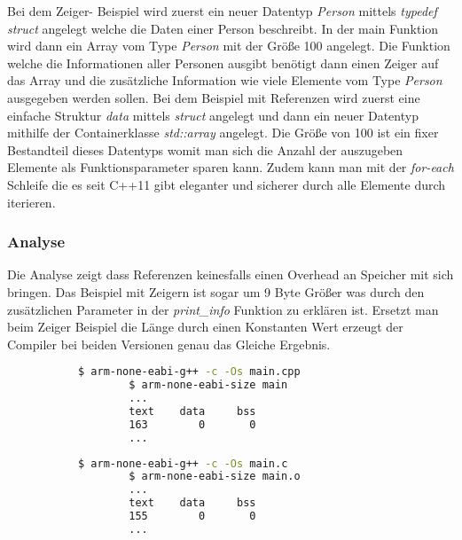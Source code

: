 \documentclass[MES,Master,ngerman]{twbook}%
\begin{document}
Bei dem Zeiger- Beispiel wird zuerst ein neuer Datentyp \textit{Person} mittels \textit{typedef struct} angelegt welche die Daten einer Person beschreibt. In der main Funktion wird dann ein Array vom Type \textit{Person} mit der Größe 100 angelegt. Die Funktion welche die Informationen aller Personen ausgibt benötigt dann einen Zeiger auf das Array und die zusätzliche Information wie viele Elemente vom Type \textit{Person} ausgegeben werden sollen.\newline \newline
Bei dem Beispiel mit Referenzen wird zuerst eine einfache Struktur \textit{data} mittels \textit{struct} angelegt und dann ein neuer Datentyp mithilfe der Containerklasse \textit{std::array} angelegt. Die Größe von 100 ist ein fixer Bestandteil dieses Datentyps womit man sich die Anzahl der auszugeben Elemente als Funktionsparameter sparen kann. Zudem kann man mit der \textit{for-each} Schleife die es seit C++11 gibt eleganter und sicherer durch alle Elemente durch iterieren. 

\subsubsection{Analyse}
Die Analyse zeigt dass Referenzen keinesfalls einen Overhead an Speicher mit sich bringen. Das Beispiel mit Zeigern ist sogar um 9 Byte Größer was durch den zusätzlichen Parameter in der \textit{print\_info} Funktion zu erklären ist. Ersetzt man beim Zeiger Beispiel die Länge durch einen Konstanten Wert erzeugt der Compiler bei beiden Versionen genau das Gleiche Ergebnis.

\begin{figure}[!htb]
	\begin{subfigure}[b]{0.5\textwidth}
		\begin{lstlisting}[gobble=6, title={Analyse Zeiger Beispiel}, language=bash, numbers=none]
		$ arm-none-eabi-g++ -c -Os main.cpp
		$ arm-none-eabi-size main
		...
		text    data     bss
		163        0       0
		...
		\end{lstlisting}
	\end{subfigure}
	\begin{subfigure}[b]{0.5\textwidth}
		\begin{lstlisting}[gobble=6, title={Analyse Referenze Beispiel}, language=bash, numbers=none]
		$ arm-none-eabi-g++ -c -Os main.c
		$ arm-none-eabi-size main.o
		...
		text    data     bss
		155        0       0
		...
		\end{lstlisting}
	\end{subfigure}
\end{figure}
\end{document}
